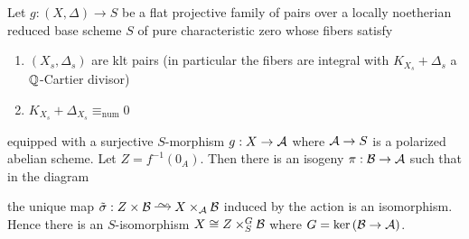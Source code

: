 \documentclass[12pt]{article}
\begin{document}
\begin{theorem} \label{thm:abelian_decomposition}
Let $g : (X, \Delta) \to S$ be a flat projective family of pairs over a locally noetherian reduced base scheme $S$ of pure characteristic zero whose fibers satisfy
\begin{enumerate}
\item $(X_s, \Delta_s)$ are klt pairs (in particular the fibers are integral with $K_{X_s} + \Delta_s$ a $\mathbb{Q}$-Cartier divisor) 
\item $K_{X_s} + \Delta_{X_s} \equiv_{\text{num}} 0$ 
\end{enumerate}
equipped with a surjective $S$-morphism $g : X \to \mathcal{A}$ where $\mathcal{A} \to S$ is a polarized abelian scheme. Let $Z = f^{-1}(0_A)$. Then there is an isogeny $\pi : \mathcal{B} \to \mathcal{A}$ such that in the diagram
\begin{center}
\end{center}
the unique map $\tilde{\sigma} : Z \times \cB \iso X \times_{\cA} \cB$ induced by the action is an isomorphism. Hence there is an $S$-isomorphism $X \cong Z \times^G_S \mathcal{B}$ where $G = \ker{(\mathcal{B}\to \mathcal{A})}$.
\end{theorem}
\end{document}
